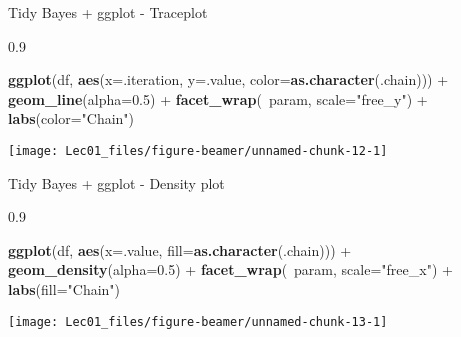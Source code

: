 \documentclass[11pt,ignorenonframetext,]{beamer}
\newenvironment{Shaded}{}{}
\newcommand{\DataTypeTok}[1]{\textcolor[rgb]{0.56,0.13,0.00}{#1}}
\newcommand{\FloatTok}[1]{\textcolor[rgb]{0.25,0.63,0.44}{#1}}
\newcommand{\KeywordTok}[1]{\textcolor[rgb]{0.00,0.44,0.13}{\textbf{#1}}}
\newcommand{\NormalTok}[1]{#1}
\newcommand{\OperatorTok}[1]{\textcolor[rgb]{0.40,0.40,0.40}{#1}}
\newcommand{\StringTok}[1]{\textcolor[rgb]{0.25,0.44,0.63}{#1}}
\let\oldShaded\Shaded
\let\endoldShaded\endShaded
\renewenvironment{Shaded}{\footnotesize\begin{spacing}{0.9}\oldShaded}{\endoldShaded\end{spacing}}
\begin{document}
\begin{frame}[fragile,t]{Tidy Bayes + ggplot - Traceplot}
\protect\hypertarget{tidy-bayes-ggplot---traceplot}{}

\scriptsize

\begin{Shaded}
\begin{Highlighting}[]
\KeywordTok{ggplot}\NormalTok{(df, }\KeywordTok{aes}\NormalTok{(}\DataTypeTok{x=}\NormalTok{.iteration, }\DataTypeTok{y=}\NormalTok{.value, }\DataTypeTok{color=}\KeywordTok{as.character}\NormalTok{(.chain))) }\OperatorTok{+}
\StringTok{  }\KeywordTok{geom_line}\NormalTok{(}\DataTypeTok{alpha=}\FloatTok{0.5}\NormalTok{) }\OperatorTok{+}
\StringTok{  }\KeywordTok{facet_wrap}\NormalTok{(}\OperatorTok{~}\NormalTok{param, }\DataTypeTok{scale=}\StringTok{"free_y"}\NormalTok{) }\OperatorTok{+}
\StringTok{  }\KeywordTok{labs}\NormalTok{(}\DataTypeTok{color=}\StringTok{"Chain"}\NormalTok{)}
\end{Highlighting}
\end{Shaded}

\begin{center}\texttt{[image: Lec01\_files/figure-beamer/unnamed-chunk-12-1]} \end{center}

\end{frame}

\begin{frame}[fragile,t]{Tidy Bayes + ggplot - Density plot}
\protect\hypertarget{tidy-bayes-ggplot---density-plot}{}

\scriptsize

\begin{Shaded}
\begin{Highlighting}[]
\KeywordTok{ggplot}\NormalTok{(df, }\KeywordTok{aes}\NormalTok{(}\DataTypeTok{x=}\NormalTok{.value, }\DataTypeTok{fill=}\KeywordTok{as.character}\NormalTok{(.chain))) }\OperatorTok{+}
\StringTok{  }\KeywordTok{geom_density}\NormalTok{(}\DataTypeTok{alpha=}\FloatTok{0.5}\NormalTok{) }\OperatorTok{+}
\StringTok{  }\KeywordTok{facet_wrap}\NormalTok{(}\OperatorTok{~}\NormalTok{param, }\DataTypeTok{scale=}\StringTok{"free_x"}\NormalTok{) }\OperatorTok{+}
\StringTok{  }\KeywordTok{labs}\NormalTok{(}\DataTypeTok{fill=}\StringTok{"Chain"}\NormalTok{)}
\end{Highlighting}
\end{Shaded}

\begin{center}\texttt{[image: Lec01\_files/figure-beamer/unnamed-chunk-13-1]} \end{center}

\end{frame}
\end{document}
